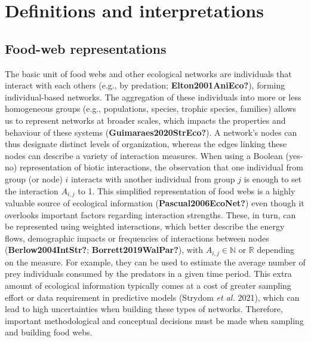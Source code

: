 \documentclass[10pt,oneside]{article}
\begin{document}
\hypertarget{definitions-and-interpretations}{%
\section{Definitions and
interpretations}\label{definitions-and-interpretations}}

\hypertarget{food-web-representations}{%
\subsection{Food-web representations}\label{food-web-representations}}

The basic unit of food webs and other ecological networks are
individuals that interact with each others (e.g., by predation;
\textbf{Elton2001AniEco?}), forming individual-based networks. The
aggregation of these individuals into more or less homogeneous groups
(e.g., populations, species, trophic species, families) allows us to
represent networks at broader scales, which impacts the properties and
behaviour of these systems (\textbf{Guimaraes2020StrEco?}). A network's
nodes can thus designate distinct levels of organization, whereas the
edges linking these nodes can describe a variety of interaction
measures. When using a Boolean (yes-no) representation of biotic
interactions, the observation that one individual from group (or node)
\(i\) interacts with another individual from group \(j\) is enough to
set the interaction \(A_{i,j}\) to 1. This simplified representation of
food webs is a highly valuable source of ecological information
(\textbf{Pascual2006EcoNet?}) even though it overlooks important factors
regarding interaction strengths. These, in turn, can be represented
using weighted interactions, which better describe the energy flows,
demographic impacts or frequencies of interactions between nodes
(\textbf{Berlow2004IntStr?}; \textbf{Borrett2019WalPar?}), with
\(A_{i,j} \in \mathbb{N}\) or \(\mathbb{R}\) depending on the measure.
For example, they can be used to estimate the average number of prey
individuals consumed by the predators in a given time period. This extra
amount of ecological information typically comes at a cost of greater
sampling effort or data requirement in predictive models (Strydom
\emph{et al.} 2021), which can lead to high uncertainties when building
these types of networks. Therefore, important methodological and
conceptual decisions must be made when sampling and building food webs.
\end{document}
